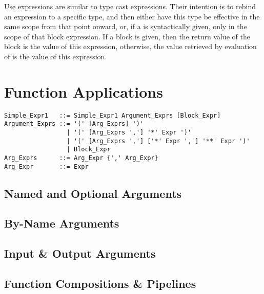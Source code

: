 Use expressions are similar to type cast expressions. Their intention is to rebind an expression to a specific type, and then either have this type be effective in the same scope from that point onward, or, if a  is syntactically given, only in the scope of that block expression. If a block is given, then the return value of the block is the value of this expression, otherwise, the value retrieved by evaluation of  is the value of this expression. 








\section{Function Applications}
\label{sec:function-applications}

\syntax\begin{lstlisting}
Simple_Expr1   ::= Simple_Expr1 Argument_Exprs [Block_Expr]
Argument_Exprs ::= '(' [Arg_Exprs] ')'
                 | '(' [Arg_Exprs ','] '*' Expr ')'
                 | '(' [Arg_Exprs ','] ['*' Expr ','] '**' Expr ')'
                 | Block_Expr
Arg_Exprs      ::= Arg_Expr {',' Arg_Expr}
Arg_Expr       ::= Expr
\end{lstlisting}







\subsection{Named and Optional Arguments}
\label{sec:named-optional-arguments}

\subsection{By-Name Arguments}
\label{sec:by-name-arguments}

\subsection{Input \& Output Arguments}
\label{sec:io-arguments}

\subsection{Function Compositions \& Pipelines}






